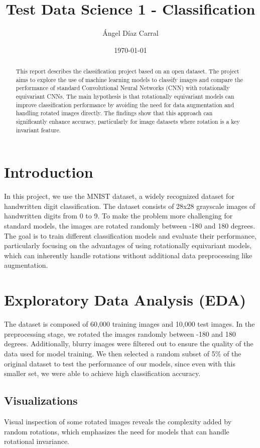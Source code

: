 \documentclass[12pt]{article}
\title{Test Data Science 1 - Classification}
\author{Ángel Díaz Carral}
\date{\today}
\begin{document}
\maketitle

\begin{abstract}
This report describes the classification project based on an open dataset. The project aims to explore the use of machine learning models to classify images and compare the performance of standard Convolutional Neural Networks (CNN) with rotationally equivariant CNNs. The main hypothesis is that rotationally equivariant models can improve classification performance by avoiding the need for data augmentation and handling rotated images directly. The findings show that this approach can significantly enhance accuracy, particularly for image datasets where rotation is a key invariant feature.
\end{abstract}

\section{Introduction}
In this project, we use the MNIST dataset, a widely recognized dataset for handwritten digit classification. The dataset consists of 28x28 grayscale images of handwritten digits from 0 to 9. To make the problem more challenging for standard models, the images are rotated randomly between -180 and 180 degrees. The goal is to train different classification models and evaluate their performance, particularly focusing on the advantages of using rotationally equivariant models, which can inherently handle rotations without additional data preprocessing like augmentation.

\section{Exploratory Data Analysis (EDA)}
The dataset is composed of 60,000 training images and 10,000 test images. In the preprocessing stage, we rotated the images randomly between -180 and 180 degrees. Additionally, blurry images were filtered out to ensure the quality of the data used for model training. We then selected a random subset of 5\% of the original dataset to test the performance of our models, since even with this smaller set, we were able to achieve high classification accuracy.

\subsection{Visualizations}
Visual inspection of some rotated images reveals the complexity added by random rotations, which emphasizes the need for models that can handle rotational invariance. 
\end{document}
